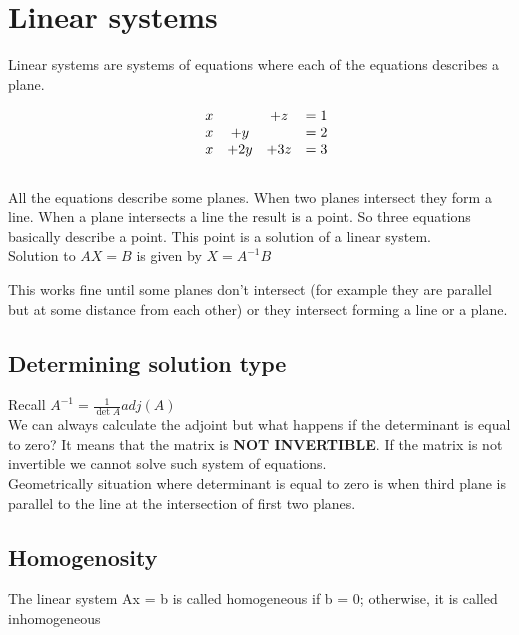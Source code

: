 \documentclass{article}
\begin{document}
    \section{Linear systems}
    Linear systems are systems of equations where each of the equations describes a plane.
    \begin{example}
        \begin{align*}
            \mqty{& x & & +z & =1\\
            & x & +y & & = 2\\
            & x & +2y & +3z & = 3}
        \end{align*}\\
        All the equations describe some planes. When two planes intersect they form a line. When a plane intersects a line the result is a point. So three equations basically describe a point. This point is a solution of a linear system.\\
        Solution to $AX=B$ is given by $X=A^{-1}B$
    \end{example}
    This works fine until some planes don't intersect (for example they are parallel but at some distance from each other) or they intersect forming a line or a plane.

    \subsection{Determining solution type}
    Recall $A^{-1}=\frac{1}{\det{A}}adj(A)$\\
    We can always calculate the adjoint but what happens if the determinant is equal to zero? It means that the matrix is \textbf{NOT INVERTIBLE}. If the matrix is not invertible we cannot solve such system of equations.\\
    Geometrically situation where determinant is equal to zero is when third plane is parallel to the line at the intersection of first two planes.
    \subsection{Homogenosity}
    The linear system Ax = b is called homogeneous if b = 0; otherwise, it is called inhomogeneous
\end{document}
